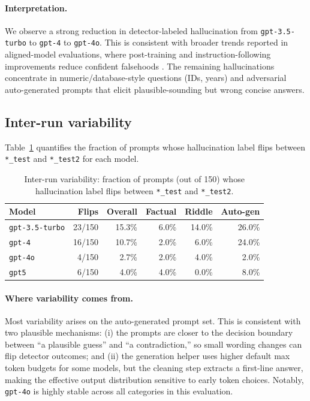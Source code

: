 \documentclass[11pt]{article}
\newcommand{\model}[1]{\texttt{#1}}
\begin{document}
\paragraph{Interpretation.}
We observe a strong reduction in detector-labeled hallucination from \model{gpt-3.5-turbo} to \model{gpt-4} to \model{gpt-4o}. This is consistent with broader trends reported in aligned-model evaluations, where post-training and instruction-following improvements reduce confident falsehoods \cite{openaiGPT4,ouyang2022instruct}. The remaining hallucinations concentrate in numeric/database-style questions (IDs, years) and adversarial auto-generated prompts that elicit plausible-sounding but wrong concise answers.

\subsection{Inter-run variability}
Table~\ref{tab:variability} quantifies the fraction of prompts whose hallucination label flips between \texttt{*\_test} and \texttt{*\_test2} for each model.

\begin{table}[t]
\centering
\caption{Inter-run variability: fraction of prompts (out of 150) whose hallucination label flips between \texttt{*\_test} and \texttt{*\_test2}.}
\label{tab:variability}
\begin{tabular}{lrrrrr}
\toprule
\textbf{Model} & \textbf{Flips} & \textbf{Overall} & \textbf{Factual} & \textbf{Riddle} & \textbf{Auto-gen} \\
\midrule
\model{gpt-3.5-turbo} & 23/150 & 15.3\% & 6.0\% & 14.0\% & 26.0\% \\
\model{gpt-4} & 16/150 & 10.7\% & 2.0\% & 6.0\% & 24.0\% \\
\model{gpt-4o} & 4/150 & 2.7\% & 2.0\% & 4.0\% & 2.0\% \\
\model{gpt5} & 6/150 & 4.0\% & 4.0\% & 0.0\% & 8.0\% \\
\bottomrule
\end{tabular}
\end{table}

\paragraph{Where variability comes from.}
Most variability arises on the auto-generated prompt set. This is consistent with two plausible mechanisms: (i) the prompts are closer to the decision boundary between ``a plausible guess'' and ``a contradiction,'' so small wording changes can flip detector outcomes; and (ii) the generation helper uses higher default max token budgets for some models, but the cleaning step extracts a first-line answer, making the effective output distribution sensitive to early token choices. Notably, \model{gpt-4o} is highly stable across all categories in this evaluation.
\end{document}

